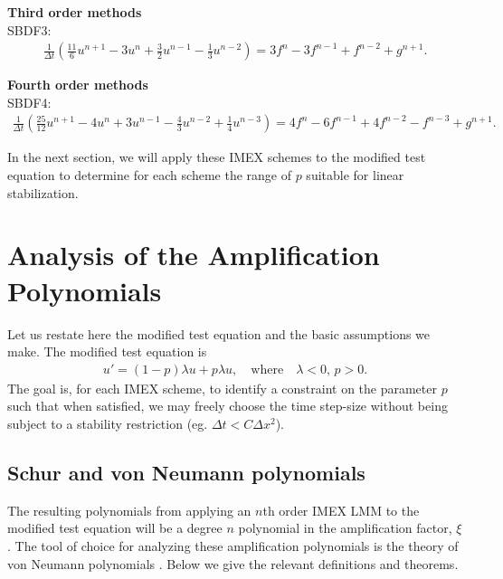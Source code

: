 \noindent
\textbf{Third order methods}\\
SBDF3:
\begin{align}
\frac{1}{\Delta t}\left(\frac{11}{6}u^{n+1} - 3u^n + \frac{3}{2}u^{n-1} - \frac{1}{3}u^{n-2} \right) 
= 3f^n - 3f^{n-1} + f^{n-2} + g^{n+1}.
\label{sbdf3}
\end{align}

\noindent
\textbf{Fourth order methods}\\
SBDF4:
\begin{align}
\frac{1}{\Delta t}\left(\frac{25}{12}u^{n+1} - 4u^n + 3u^{n-1} - \frac{4}{3}u^{n-2} + \frac{1}{4}u^{n-3} \right) 
= 4f^n - 6f^{n-1} + 4f^{n-2} -f^{n-3} + g^{n+1}.
\label{sbdf4}
\end{align}

In the next section, we will apply these IMEX schemes to the modified test equation to determine for each scheme the range of $p$ suitable for linear stabilization.

\section{Analysis of the Amplification Polynomials}
Let us restate here the modified test equation and the basic assumptions we make.
The modified test equation is 
\begin{align*}
        u' = (1-p)\lambda u + p\lambda u,
\quad\text{where}\quad \lambda < 0\text{, } p>0.
\label{mtee}
\end{align*}
The goal is, for each IMEX scheme, to identify a constraint on the parameter $p$ such that when satisfied, we may freely choose the time step-size without being subject to a stability restriction (eg. $\Delta t < C\Delta x^2$).

\subsection{Schur and von Neumann polynomials}
The resulting polynomials from applying an $n$th order IMEX LMM to the modified test equation will be a degree $n$ polynomial in the amplification factor, $\xi$. The tool of choice for analyzing these amplification polynomials is the theory of von Neumann polynomials \cite[Chapter 4]{strikwerda2004finite}. Below we give the relevant definitions and theorems.

